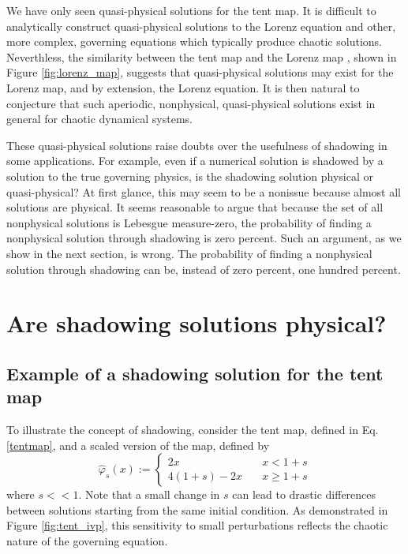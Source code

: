 We have only seen quasi-physical solutions for the tent map.
It is difficult to analytically construct quasi-physical solutions
to the Lorenz equation and other, more complex, governing
equations which typically produce chaotic solutions.  Neverthless, the similarity 
between the tent map and the Lorenz map \cite{tent2}, shown in Figure \ref{fig:lorenz_map}, suggests that
quasi-physical solutions may exist for the Lorenz map, and by
extension, the Lorenz equation.  It is then natural to conjecture
that such aperiodic, nonphysical, quasi-physical solutions
exist in general for chaotic dynamical systems.

These quasi-physical solutions raise doubts over the usefulness of shadowing
in some applications.  For example, even if a numerical
solution is shadowed by a solution to the true governing physics,
is the shadowing solution physical or quasi-physical? At first glance, this may 
seem to be a nonissue because almost all solutions are physical. 
It seems reasonable to argue that because the set of
all nonphysical solutions is Lebesgue measure-zero, the probability of finding
a nonphysical solution through shadowing is zero percent.  Such an argument,
as we show in the next section, is wrong.  The probability of
finding a nonphysical solution through shadowing can be, instead of
zero percent, one hundred percent.

\section{Are shadowing solutions physical?}

\subsection{Example of a shadowing solution for the tent map}
\label{sec:sub:shadow-example}
To illustrate the concept of shadowing, consider the tent map, defined
in Eq. \ref{tentmap}, and a scaled version of the map, defined by
\begin{equation} \label{tent_scaled}
    \hat\varphi_s(x) := \begin{cases}
    2x \quad & x < 1+s \\
    4(1+s) - 2x \quad & x \ge 1+s
    \end{cases}
\end{equation}
where $s<<1$.  Note that a small change in $s$ can lead to drastic differences 
between solutions starting from the same initial condition.
As demonstrated in Figure \ref{fig:tent_ivp}, this sensitivity to small
perturbations reflects the chaotic nature of the governing equation.

